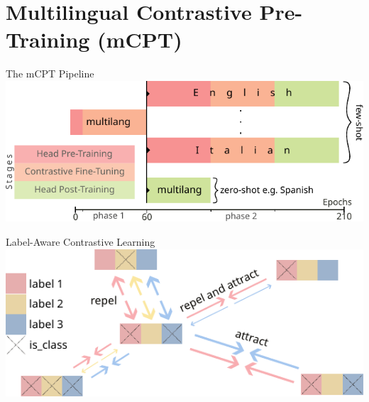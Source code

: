 \documentclass[aspectratio=169,onlytextwidth]{beamer}
\begin{document}
\section{Multilingual Contrastive Pre-Training (mCPT)}

\begin{frame}{The mCPT Pipeline}
  \centering
  \includegraphics[height=0.6\textheight]{pipeline}
\end{frame}

\begin{frame}{Label-Aware Contrastive Learning}
  \centering
  \includegraphics[height=0.6\textheight]{contrast}
\end{frame}
\end{document}
